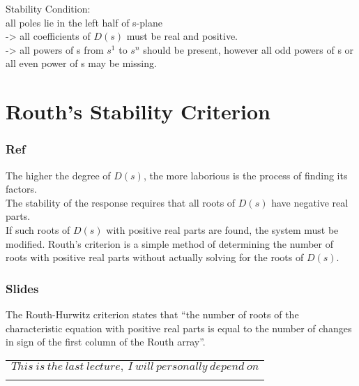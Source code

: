 Stability Condition:\\

all poles lie in the left half of s-plane\\

-> all coefficients of $D(s)$ must be real and positive.\\

-> all powers of s from $s^1$ to $s^n$ should be present, however all odd powers of s or all even power of s may be missing.\\

\section{Routh's Stability Criterion}

\subsubsection{Ref}

The higher the degree of $D(s)$, the more laborious is the process of finding its factors.\\

The stability of the response requires that all roots of $D(s)$ have negative real parts.\\

If such roots of $D(s)$ with positive real parts are found, the system must be modified. Routh's
criterion is a simple method of determining the number of roots with positive real parts without
actually solving for the roots of $D(s)$.\\

\subsubsection{Slides}

The Routh-Hurwitz criterion states that 
``the number of roots of the characteristic equation with positive real parts is equal to the
 number of changes in sign of the first column of the Routh array''.

\begin{table*}[!b]
	\begin{tabular}{p{16cm}}
		\multicolumn{1}{m{16cm}}{\LARGE{$This\ is\ the\ last\ lecture,\ I\ will\ personally\ depend\ on$}}\\[+1em]
		\multicolumn{1}{r}{
			\fbox{
			    \parbox{8.2cm}{
			    	\LARGE{\href{https://drive.google.com/drive/folders/1G3lhSEKO3itcgrWF_8Sl6ArfrC4g3E8-}{$\ Dr.\ Imtiaz\ Hussain\ Lectures\ $}}
		    	}
			}
		}
		
	\end{tabular}
\end{table*}
